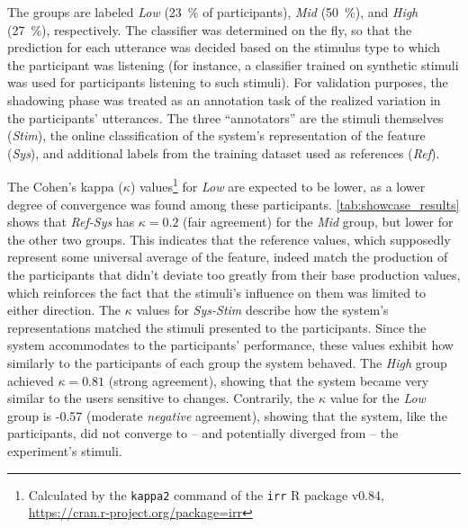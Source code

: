 The groups are labeled \emph{Low} (\SI{23}{\percent} of participants), \emph{Mid} (\SI{50}{\percent}), and \emph{High} (\SI{27}{\percent}), respectively.
The classifier was determined on the fly, so that the prediction for each utterance was decided based on the stimulus type to which the participant was listening (for instance, a classifier trained on synthetic stimuli was used for participants listening to such stimuli).
For validation purposes, the shadowing phase was treated as an annotation task of the realized variation in the participants' utterances.
The three \enquote{annotators} are the stimuli themselves (\emph{Stim}), the online classification of the system's representation of the feature (\emph{Sys}), and additional labels from the training dataset used as references (\emph{Ref}).

The Cohen's kappa ($\kappa$) values\footnote{Calculated by the \texttt{kappa2} command of the \texttt{irr} R package v0.84, \url{https://cran.r-project.org/package=irr}} for \emph{Low} are expected to be lower, as a lower degree of convergence was found among these participants.
\cref{tab:showcase_results} shows that \emph{Ref-Sys} has $\kappa = 0.2$ (fair agreement) for the \emph{Mid} group, but lower for the other two groups.
This indicates that the reference values, which supposedly represent some universal average of the feature, indeed match the production of the participants that didn't deviate too greatly from their base production values, which reinforces the fact that the stimuli's influence on them was limited to either direction.
The $\kappa$ values for \emph{Sys-Stim} describe how the system's representations matched the stimuli presented to the participants.
Since the system accommodates to the participants' performance, these values exhibit how similarly to the participants of each group the system behaved.
The \emph{High} group achieved $\kappa = 0.81$ (strong agreement), showing that the system became very similar to the users sensitive to changes.
Contrarily, the $\kappa$ value for the \emph{Low} group is -0.57 (moderate \emph{negative} agreement), showing that the system, like the participants, did not converge to -- and potentially diverged from -- the experiment's stimuli.
